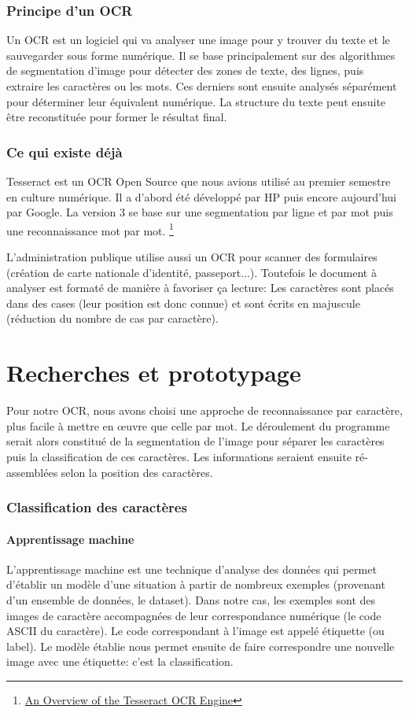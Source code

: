 \documentclass[a4paper, 12pt]{article}
\begin{document}
\section{Principe d'un OCR}
Un OCR est un logiciel qui va analyser une image pour y trouver du texte et le sauvegarder sous forme numérique. Il se base principalement sur des algorithmes de segmentation d'image pour détecter des zones de texte, des lignes, puis extraire les caractères ou les mots. Ces derniers sont ensuite analysés séparément pour déterminer leur équivalent numérique. La structure du texte peut ensuite être reconstituée pour former le résultat final.

\section{Ce qui existe déjà}
Tesseract est un OCR Open Source que nous avions utilisé au premier semestre en culture numérique. Il a d'abord été développé par HP puis encore aujourd'hui par Google. La version 3 se base sur une segmentation par ligne et par mot puis une reconnaissance mot par mot. \footnote{\href{https://github.com/tesseract-ocr/docs/blob/master/tesseracticdar2007.pdf}{An Overview of the Tesseract OCR Engine}}

L'administration publique utilise aussi un OCR pour scanner des formulaires (création de carte nationale d'identité, passeport...). Toutefois le document à analyser est formaté de manière à favoriser ça lecture: Les caractères sont placés dans des cases (leur position est donc connue) et sont écrits en majuscule (réduction du nombre de cas par caractère).

\pagebreak
\part{Recherches et prototypage}
Pour notre OCR, nous avons choisi une approche de reconnaissance par caractère, plus facile à mettre en œuvre que celle par mot. Le déroulement du programme serait alors constitué de la segmentation de l'image pour séparer les caractères puis la classification de ces caractères. Les informations seraient ensuite ré-assemblées selon la position des caractères.

\section{Classification des caractères}

\subsection{Apprentissage machine}
L'apprentissage machine est une technique d'analyse des données qui permet d'établir un modèle d'une situation à partir de nombreux exemples (provenant d'un ensemble de données, le dataset). Dans notre cas, les exemples sont des images de caractère accompagnées de leur correspondance numérique (le code ASCII du caractère). Le code correspondant à l'image est appelé étiquette (ou label). Le modèle établie nous permet ensuite de faire correspondre une nouvelle image avec une étiquette: c'est la classification.
\end{document}
